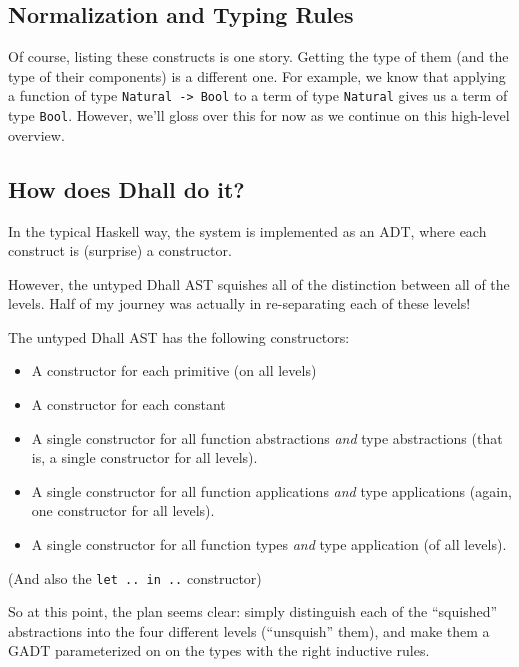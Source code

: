 \documentclass[]{article}
\begin{document}
\hypertarget{normalization-and-typing-rules}{%
\subsection{Normalization and Typing
Rules}\label{normalization-and-typing-rules}}

Of course, listing these constructs is one story. Getting the type of them (and
the type of their components) is a different one. For example, we know that
applying a function of type \texttt{Natural\ -\textgreater{}\ Bool} to a term of
type \texttt{Natural} gives us a term of type \texttt{Bool}. However, we'll
gloss over this for now as we continue on this high-level overview.

\hypertarget{how-does-dhall-do-it}{%
\subsection{How does Dhall do it?}\label{how-does-dhall-do-it}}

In the typical Haskell way, the system is implemented as an ADT, where each
construct is (surprise) a constructor.

However, the untyped Dhall AST squishes all of the distinction between all of
the levels. Half of my journey was actually in re-separating each of these
levels!

The untyped Dhall AST has the following constructors:

\begin{itemize}
\tightlist
\item
  A constructor for each primitive (on all levels)
\item
  A constructor for each constant
\item
  A single constructor for all function abstractions \emph{and} type
  abstractions (that is, a single constructor for all levels).
\item
  A single constructor for all function applications \emph{and} type
  applications (again, one constructor for all levels).
\item
  A single constructor for all function types \emph{and} type application (of
  all levels).
\end{itemize}

(And also the \texttt{let\ ..\ in\ ..} constructor)

So at this point, the plan seems clear: simply distinguish each of the
``squished'' abstractions into the four different levels (``unsquish'' them),
and make them a GADT parameterized on on the types with the right inductive
rules.
\end{document}
